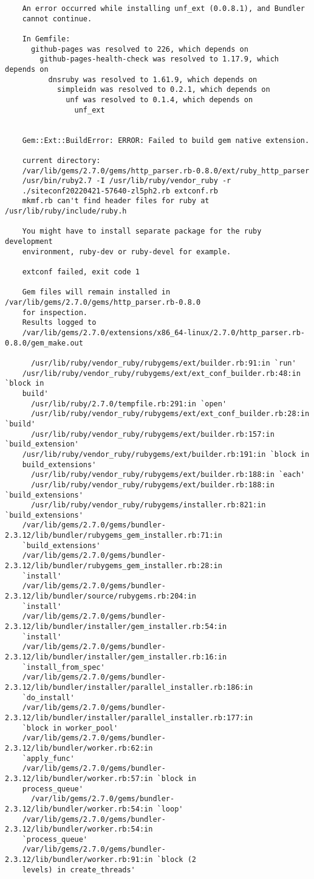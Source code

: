 \documentclass{article}
\numberwithin{equation}{section}
\begin{document}
\begin{verbatim}
	An error occurred while installing unf_ext (0.0.8.1), and Bundler
	cannot continue.
	
	In Gemfile:
	  github-pages was resolved to 226, which depends on
	    github-pages-health-check was resolved to 1.17.9, which depends on
	      dnsruby was resolved to 1.61.9, which depends on
	        simpleidn was resolved to 0.2.1, which depends on
	          unf was resolved to 0.1.4, which depends on
	            unf_ext
	
	
	Gem::Ext::BuildError: ERROR: Failed to build gem native extension.
	
	current directory:
	/var/lib/gems/2.7.0/gems/http_parser.rb-0.8.0/ext/ruby_http_parser
	/usr/bin/ruby2.7 -I /usr/lib/ruby/vendor_ruby -r
	./siteconf20220421-57640-zl5ph2.rb extconf.rb
	mkmf.rb can't find header files for ruby at /usr/lib/ruby/include/ruby.h
	
	You might have to install separate package for the ruby development
	environment, ruby-dev or ruby-devel for example.
	
	extconf failed, exit code 1
	
	Gem files will remain installed in /var/lib/gems/2.7.0/gems/http_parser.rb-0.8.0
	for inspection.
	Results logged to
	/var/lib/gems/2.7.0/extensions/x86_64-linux/2.7.0/http_parser.rb-0.8.0/gem_make.out
	
	  /usr/lib/ruby/vendor_ruby/rubygems/ext/builder.rb:91:in `run'
	/usr/lib/ruby/vendor_ruby/rubygems/ext/ext_conf_builder.rb:48:in `block in
	build'
	  /usr/lib/ruby/2.7.0/tempfile.rb:291:in `open'
	  /usr/lib/ruby/vendor_ruby/rubygems/ext/ext_conf_builder.rb:28:in `build'
	  /usr/lib/ruby/vendor_ruby/rubygems/ext/builder.rb:157:in `build_extension'
	/usr/lib/ruby/vendor_ruby/rubygems/ext/builder.rb:191:in `block in
	build_extensions'
	  /usr/lib/ruby/vendor_ruby/rubygems/ext/builder.rb:188:in `each'
	  /usr/lib/ruby/vendor_ruby/rubygems/ext/builder.rb:188:in `build_extensions'
	  /usr/lib/ruby/vendor_ruby/rubygems/installer.rb:821:in `build_extensions'
	/var/lib/gems/2.7.0/gems/bundler-2.3.12/lib/bundler/rubygems_gem_installer.rb:71:in
	`build_extensions'
	/var/lib/gems/2.7.0/gems/bundler-2.3.12/lib/bundler/rubygems_gem_installer.rb:28:in
	`install'
	/var/lib/gems/2.7.0/gems/bundler-2.3.12/lib/bundler/source/rubygems.rb:204:in
	`install'
	/var/lib/gems/2.7.0/gems/bundler-2.3.12/lib/bundler/installer/gem_installer.rb:54:in
	`install'
	/var/lib/gems/2.7.0/gems/bundler-2.3.12/lib/bundler/installer/gem_installer.rb:16:in
	`install_from_spec'
	/var/lib/gems/2.7.0/gems/bundler-2.3.12/lib/bundler/installer/parallel_installer.rb:186:in
	`do_install'
	/var/lib/gems/2.7.0/gems/bundler-2.3.12/lib/bundler/installer/parallel_installer.rb:177:in
	`block in worker_pool'
	/var/lib/gems/2.7.0/gems/bundler-2.3.12/lib/bundler/worker.rb:62:in
	`apply_func'
	/var/lib/gems/2.7.0/gems/bundler-2.3.12/lib/bundler/worker.rb:57:in `block in
	process_queue'
	  /var/lib/gems/2.7.0/gems/bundler-2.3.12/lib/bundler/worker.rb:54:in `loop'
	/var/lib/gems/2.7.0/gems/bundler-2.3.12/lib/bundler/worker.rb:54:in
	`process_queue'
	/var/lib/gems/2.7.0/gems/bundler-2.3.12/lib/bundler/worker.rb:91:in `block (2
	levels) in create_threads'
	

\end{verbatim}
\end{document}
